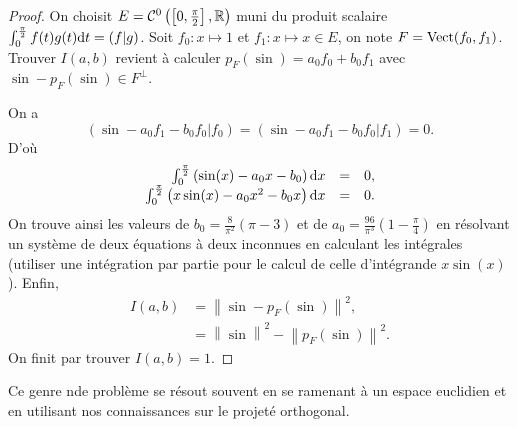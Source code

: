 \documentclass[12pt]{article}
\begin{document}
\begin{proof}
	On choisit $E=\mathcal{C}^{0}\left(\left[0,\frac{\pi}{2}\right],\mathbb{R}\right)$ muni du produit scalaire $\int_{0}^{\frac{\pi}{2}}f(t)g(t)\mathrm{d} t=(f|g)$. Soit $f_0\colon x\mapsto 1$ et $f_1\colon x\mapsto x\in E$, on note $F=\operatorname{Vect}(f_0,f_1)$. Trouver $I(a,b)$ revient à calculer $p_F(\sin)=a_0 f_0+b_0 f_1$ avec $\sin-p_{F}(\sin)\in F^{\perp}$.

	On a 
	\begin{equation}
		(\sin -a_{0}f_1-b_{0}f_0|f_{0})=(\sin -a_{0}f_1-b_{0}f_0|f_{1})=0.
	\end{equation}
	D'où 
	\begin{equation}
		\begin{array}[]{rcl}
			\int_{0}^{\frac{\pi}{2}}\left(\sin(x)-a_0 x-b_{0}\right)\d x&=&0,\\
			\int_{0}^{\frac{\pi}{2}}\left(x\sin(x)-a_0 x^{2}-b_{0}x\right)\d x&=&0.
		\end{array}
	\end{equation}
	On trouve ainsi les valeurs de $b_0=\frac{8}{\pi^{2}}(\pi-3)$ et de $a_0=\frac{96}{\pi^{3}}\left(1-\frac{\pi}{4}\right)$ en résolvant un système de deux équations à deux inconnues en calculant les intégrales (utiliser une intégration par partie pour le calcul de celle d'intégrande $x\sin(x)$). Enfin,
	\begin{align}
		I(a,b)
		&=\left\lVert\sin-p_F(\sin)\right\rVert^{2},\\
		&=\left\lVert \sin\right\rVert^{2}-\left\lVert p_F(\sin)\right\rVert^{2}.
	\end{align}
	On finit par trouver $I(a,b)=1$.
\end{proof}

\begin{remark}
	Ce genre nde problème se résout souvent en se ramenant à un espace euclidien et en utilisant nos connaissances sur le projeté orthogonal.
\end{remark}
\end{document}
